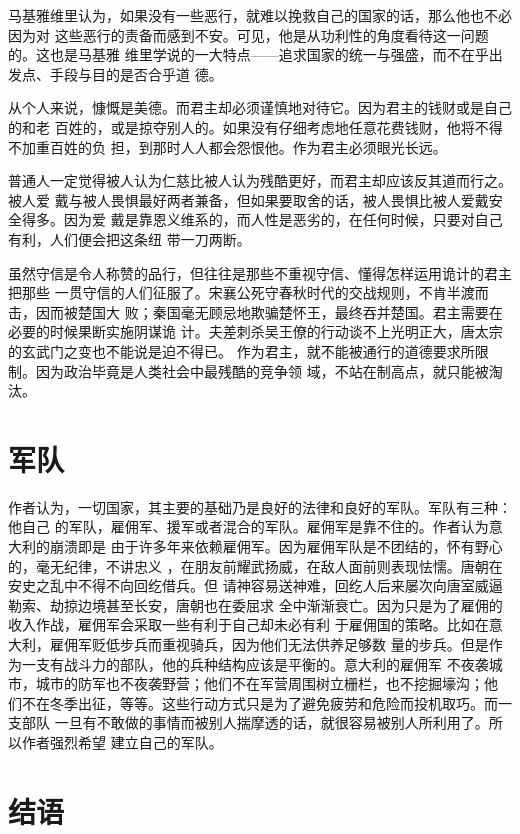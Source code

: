 马基雅维里认为，如果没有一些恶行，就难以挽救自己的国家的话，那么他也不必因为对
这些恶行的责备而感到不安。可见，他是从功利性的角度看待这一问题的。这也是马基雅
维里学说的一大特点——追求国家的统一与强盛，而不在乎出发点、手段与目的是否合乎道
德。

从个人来说，慷慨是美德。而君主却必须谨慎地对待它。因为君主的钱财或是自己的和老
百姓的，或是掠夺别人的。如果没有仔细考虑地任意花费钱财，他将不得不加重百姓的负
担，到那时人人都会怨恨他。作为君主必须眼光长远。

普通人一定觉得被人认为仁慈比被人认为残酷更好，而君主却应该反其道而行之。被人爱
戴与被人畏惧最好两者兼备，但如果要取舍的话，被人畏惧比被人爱戴安全得多。因为爱
戴是靠恩义维系的，而人性是恶劣的，在任何时候，只要对自己有利，人们便会把这条纽
带一刀两断。

虽然守信是令人称赞的品行，但往往是那些不重视守信、懂得怎样运用诡计的君主把那些
一贯守信的人们征服了。宋襄公死守春秋时代的交战规则，不肯半渡而击，因而被楚国大
败；秦国毫无顾忌地欺骗楚怀王，最终吞并楚国。君主需要在必要的时候果断实施阴谋诡
计。夫差刺杀吴王僚的行动谈不上光明正大，唐太宗的玄武门之变也不能说是迫不得已。
作为君主，就不能被通行的道德要求所限制。因为政治毕竟是人类社会中最残酷的竞争领
域，不站在制高点，就只能被淘汰。

\section{军队}

作者认为，一切国家，其主要的基础乃是良好的法律和良好的军队。军队有三种：他自己
的军队，雇佣军、援军或者混合的军队。雇佣军是靠不住的。作者认为意大利的崩溃即是
由于许多年来依赖雇佣军。因为雇佣军队是不团结的，怀有野心的，毫无纪律，不讲忠义
，在朋友前耀武扬威，在敌人面前则表现怯懦。唐朝在安史之乱中不得不向回纥借兵。但
请神容易送神难，回纥人后来屡次向唐室威逼勒索、劫掠边境甚至长安，唐朝也在委屈求
全中渐渐衰亡。因为只是为了雇佣的收入作战，雇佣军会采取一些有利于自己却未必有利
于雇佣国的策略。比如在意大利，雇佣军贬低步兵而重视骑兵，因为他们无法供养足够数
量的步兵。但是作为一支有战斗力的部队，他的兵种结构应该是平衡的。意大利的雇佣军
不夜袭城市，城市的防军也不夜袭野营；他们不在军营周围树立栅栏，也不挖掘壕沟；他
们不在冬季出征，等等。这些行动方式只是为了避免疲劳和危险而投机取巧。而一支部队
一旦有不敢做的事情而被别人揣摩透的话，就很容易被别人所利用了。所以作者强烈希望
建立自己的军队。

\section{结语}

